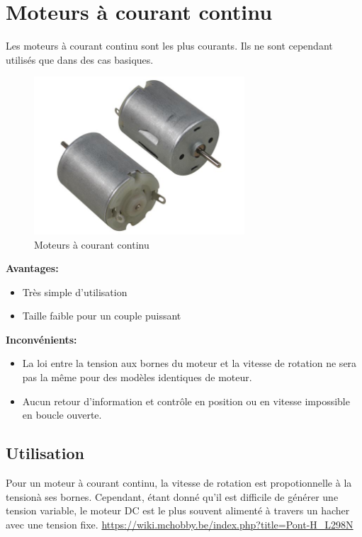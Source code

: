 \documentclass[a4paper, 11pt]{report}
\begin{document}
\section{Moteurs à courant continu}

Les moteurs à courant continu sont les plus courants. Ils ne sont cependant utilisés que dans des cas basiques.

\begin{figure}[h]
\begin{centering}
\includegraphics[width=0.7\textwidth]{images/MoteurDC.jpeg}
\caption{Moteurs à courant continu}
\par\end{centering}
\end{figure}

\textbf{Avantages:}
\begin{itemize}
\item Très simple d'utilisation
\item Taille faible pour un couple puissant
\end{itemize}

\textbf{Inconvénients:}
\begin{itemize}
\item La loi entre la tension aux bornes du moteur et la vitesse de rotation ne sera pas la même pour des modèles identiques de moteur.
\item Aucun retour d'information et contrôle en position ou en vitesse impossible en boucle ouverte.
\end{itemize}


\subsection{Utilisation}
Pour un moteur à courant continu, la vitesse de rotation est propotionnelle à la tensionà ses bornes. Cependant, étant donné qu'il est difficile de générer une tension variable, le moteur DC est le plus souvent alimenté à travers un hacher avec une tension fixe.
\url{https://wiki.mchobby.be/index.php?title=Pont-H_L298N}
\end{document}

